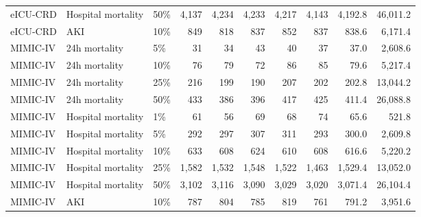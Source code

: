 \begin{tabular}{lllrrrrrrr}
eICU-CRD & Hospital mortality & 50\% & 4,137 & 4,234 & 4,233 & 4,217 & 4,143 & 4,192.8 & 46,011.2 \\
eICU-CRD & AKI & 10\% & 849 & 818 & 837 & 852 & 837 & 838.6 & 6,171.4 \\
MIMIC-IV & 24h mortality & 5\% & 31 & 34 & 43 & 40 & 37 & 37.0 & 2,608.6 \\
MIMIC-IV & 24h mortality & 10\% & 76 & 79 & 72 & 86 & 85 & 79.6 & 5,217.4 \\
MIMIC-IV & 24h mortality & 25\% & 216 & 199 & 190 & 207 & 202 & 202.8 & 13,044.2 \\
MIMIC-IV & 24h mortality & 50\% & 433 & 386 & 396 & 417 & 425 & 411.4 & 26,088.8 \\
MIMIC-IV & Hospital mortality & 1\% & 61 & 56 & 69 & 68 & 74 & 65.6 & 521.8 \\
MIMIC-IV & Hospital mortality & 5\% & 292 & 297 & 307 & 311 & 293 & 300.0 & 2,609.8 \\
MIMIC-IV & Hospital mortality & 10\% & 633 & 608 & 624 & 610 & 608 & 616.6 & 5,220.2 \\
MIMIC-IV & Hospital mortality & 25\% & 1,582 & 1,532 & 1,548 & 1,522 & 1,463 & 1,529.4 & 13,052.0 \\
MIMIC-IV & Hospital mortality & 50\% & 3,102 & 3,116 & 3,090 & 3,029 & 3,020 & 3,071.4 & 26,104.4 \\
MIMIC-IV & AKI & 10\% & 787 & 804 & 785 & 819 & 761 & 791.2 & 3,951.6 \\
\bottomrule
\end{tabular}
